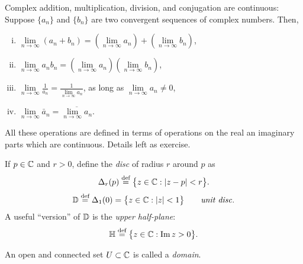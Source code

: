 \documentclass[10pt,aspectratio=169]{beamer}
\begin{document}
\begin{frame}

\begin{proposition}
Complex addition, multiplication, division, and conjugation are continuous:
Suppose $\{ a_n \}$ and $\{ b_n \}$ are two convergent sequences
of complex numbers.  Then,
\begin{enumerate}[(i)]
\item
$\lim\limits_{n\to\infty} (a_n + b_n) = 
\left(\lim\limits_{n\to\infty} a_n \right) +
\left(\lim\limits_{n\to\infty} b_n \right)$,
\item
$\lim\limits_{n\to\infty} a_n b_n = 
\left(\lim\limits_{n\to\infty} a_n \right)
\left(\lim\limits_{n\to\infty} b_n \right)$,
\item
$\lim\limits_{n\to\infty} \frac{1}{a_n} = \frac{1}{\lim\limits_{n\to\infty} a_n}$,
as long as $\lim\limits_{n\to\infty} a_n \not= 0$,
\item
$\lim\limits_{n\to\infty} \bar{a}_n = 
\overline{\lim\limits_{n\to\infty} a_n}$.
\end{enumerate}
\end{proposition}

\medskip
\pause

All these operations are defined in terms of operations on the real an
imaginary parts which are continuous.  Details left as exercise.

\end{frame}

\begin{frame}

If $p \in {\mathbb{C}}$ and $r > 0$, define the \emph{disc} of radius $r$ around $p$
as
\begin{equation*}
\Delta_r(p)
\overset{\text{def}}{=}
\bigl\{ z \in {\mathbb{C}} : \lvert {z-p} \rvert < r \bigr\} .
\end{equation*}
\pause
\begin{equation*}
{\mathbb{D}}
\overset{\text{def}}{=}
\Delta_1(0)
=
\bigl\{ z \in {\mathbb{C}} : \lvert {z} \rvert < 1 \bigr\} 
\qquad \text{\emph{unit disc}}.
\end{equation*}
\pause
A useful ``version'' of ${\mathbb{D}}$ is the \emph{upper half-plane}:
\begin{equation*}
{\mathbb{H}} 
\overset{\text{def}}{=}
\bigl\{
z \in {\mathbb{C}} : \operatorname{Im} z > 0
\bigr\} .
\end{equation*}

\medskip
\pause

\begin{definition}
An open and connected set $U \subset {\mathbb{C}}$ is called a
\emph{domain}.
\end{definition}

\end{frame}
\end{document}
